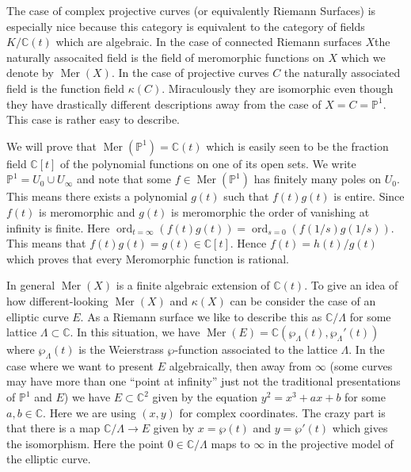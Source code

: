 \documentclass[]{book}
\numberwithin{equation}{section}
\theoremstyle{definition}
\theoremstyle{remark}
\newcommand{\CC}{\mathbb{C}}
\newcommand{\PP}{\mathbb{P}}
\newcommand{\Mer}{\operatorname{Mer}}
\newcommand{\ord}{\operatorname{ord}}
\begin{document}
The case of complex projective curves (or equivalently Riemann Surfaces) is especially nice because this category is equivalent to the category of fields $K/\CC(t)$ which are algebraic. 
In the case of connected Riemann surfaces $X$the naturally assocaited field is the field of meromorphic functions on $X$ which we denote by $\Mer(X)$. 
In the case of projective curves $C$ the naturally associated field is the function field $\kappa(C)$.
Miraculously they are isomorphic even though they have drastically different descriptions away from the case of $X=C=\PP^1$. 
This case is rather easy to describe. 

We will prove that $\Mer(\PP^1) = \CC(t)$ which is easily seen to be the fraction field $\CC[t]$ of the polynomial functions on one of its open sets. 
We write $\PP^1 = U_0 \cup U_{\infty}$ and note that some $f \in \Mer(\PP^1)$ has finitely many poles on $U_0$. 
This means there exists a polynomial $g(t)$ such that $f(t)g(t)$ is entire. 
Since $f(t)$ is meromorphic and $g(t)$ is meromorphic the order of vanishing at infinity is finite. 
Here $\ord_{t=\infty} ( f(t) g(t)) = \ord_{s=0}(f(1/s)g(1/s) )$. 
This means that $f(t)g(t) = g(t) \in \CC[t]$. 
Hence $f(t) = h(t)/g(t)$ which proves that every Meromorphic function is rational.

In general $\Mer(X)$ is a finite algebraic extension of $\CC(t)$. 
To give an idea of how different-looking $\Mer(X)$ and $\kappa(X)$ can be consider the case of an elliptic curve $E$. 
As a Riemann surface we like to describe this as $\CC/\Lambda$ for some lattice $\Lambda \subset \CC$. 
In this situation, we have $\Mer(E) = \CC(\wp_{\Lambda}(t), \wp_{\Lambda}'(t))$ where $\wp_{\Lambda}(t)$ is the Weierstrass $\wp$-function associated to the lattice $\Lambda$. 
In the case where we want to present $E$ algebraically, then away from $\infty$ (some curves may have more than one ``point at infinity'' just not the traditional presentations of $\PP^1$ and $E$) we have $E \subset \CC^2$ given by the equation $y^2 = x^3+ax+b$ for some $a,b\in \CC$. 
Here we are using $(x,y)$ for complex coordinates. 
The crazy part is that there is a map $\CC/\Lambda \to E$ given by $x = \wp(t)$ and $y=\wp'(t)$ which gives the isomorphism. 
Here the point $0 \in \CC/\Lambda$ maps to $\infty$ in the projective model of the elliptic curve. 
\end{document}

